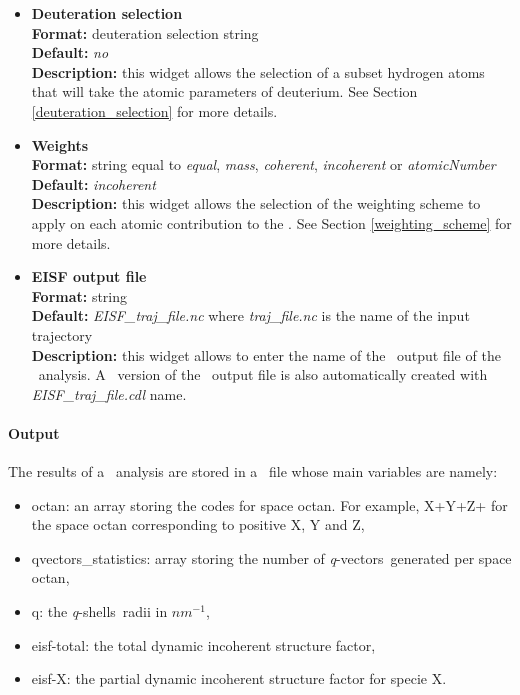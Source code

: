 \documentclass[a4paper,11pt]{report}
\newcommand{\invnm}{$nm^{-1}$}
\newcommand{\qvects}{\textit{q}-vectors}
\newcommand{\qshells}{\textit{q}-shells}
\begin{document}
\begin{itemize}
\item \textbf{Deuteration selection}\\
\textbf{Format:} deuteration selection string\\
\textbf{Default:} \textit{no}\\
\textbf{Description:} this widget allows the selection of a subset hydrogen atoms that will take the atomic parameters 
of deuterium. See Section \ref{deuteration_selection} for more details.

\item \textbf{Weights}\\
\textbf{Format:} string equal to \textit{equal}, \textit{mass}, \textit{coherent}, \textit{incoherent} or \textit{atomicNumber}\\
\textbf{Default:} \textit{incoherent}\\
\textbf{Description:} this widget allows the selection of the weighting scheme to apply on each atomic contribution 
to the \DISF . See Section \ref{weighting_scheme} for more details. 

\item \textbf{EISF output file}\\
\textbf{Format:} string\\
\textbf{Default:} \textit{EISF\_traj\_file.nc} where \textit{traj\_file.nc} is the name of the input trajectory\\
\textbf{Description:} this widget allows to enter the name of the \NetCDF\ output file of the \EISF\ analysis. A \CDL\ 
version of the \NetCDF\ output file is also automatically created with \textit{EISF\_traj\_file.cdl} name.
\end{itemize}

\paragraph{Output\\}
The results of a \EISF\ analysis are stored in a \NetCDF\ file whose main variables are namely:
\begin{itemize}
\item octan: an array storing the codes for space octan. For example, X+Y+Z+ for the space octan corresponding to positive
X, Y and Z,
\item qvectors\_statistics: array storing the number of \qvects\ generated per space octan,
\item q: the \qshells\ radii in \invnm ,
\item eisf-total: the total dynamic incoherent structure factor,
\item eisf-X: the partial dynamic incoherent structure factor for specie X.
\end{itemize}
\end{document}
